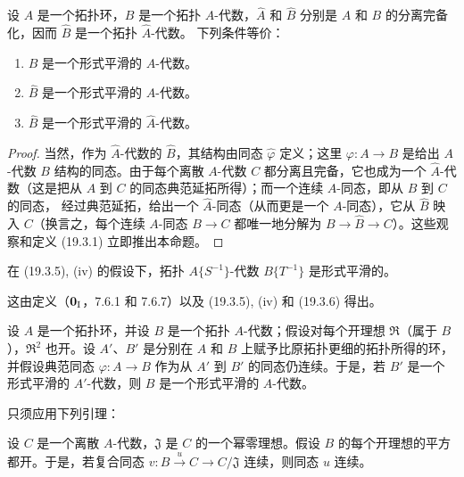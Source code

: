 \begin{proposition}[19.3.6]
\label{0.19.3.6-fr}
设 $A$ 是一个拓扑环，$B$ 是一个拓扑 $A$-代数，$\hat A$ 和 $\hat B$
分别是 $A$ 和 $B$ 的分离完备化，因而 $\hat B$ 是一个拓扑 $\hat A$-代数。
下列条件等价：
\begin{enumerate}
  \item[a)] $B$ 是一个形式平滑的 $A$-代数。
  \item[b)] $\hat B$ 是一个形式平滑的 $A$-代数。
  \item[c)] $\hat B$ 是一个形式平滑的 $\hat A$-代数。
\end{enumerate}
\end{proposition}

\begin{proof}
当然，作为 $\hat A$-代数的 $\hat B$，其结构由同态 $\hat\varphi$ 定义；这里
$\varphi:A\to B$ 是给出 $A$-代数 $B$ 结构的同态。由于每个离散
$A$-代数 $C$ 都分离且完备，它也成为一个 $\hat A$-代数（这是把从 $A$ 到
$C$ 的同态典范延拓所得）；而一个连续 $A$-同态，即从 $B$ 到 $C$ 的同态，
经过典范延拓，给出一个 $\hat A$-同态（从而更是一个 $A$-同态），它从
$\hat B$ 映入 $C$（换言之，每个连续 $A$-同态 $B\to C$ 都唯一地分解为
$B\to\hat B\to C$）。这些观察和定义 (19.3.1) 立即推出本命题。
\end{proof}

\begin{corollary}[19.3.7]
\label{0.19.3.7-fr}
在 (19.3.5), (iv) 的假设下，拓扑 $A\{S^{-1}\}$-代数
$B\{T^{-1}\}$ 是形式平滑的。
\end{corollary}

这由定义（$\mathbf 0_{\rm I}$，7.6.1 和 7.6.7）以及 (19.3.5), (iv) 和
(19.3.6) 得出。

\begin{proposition}[19.3.8]
\label{0.19.3.8-fr}
设 $A$ 是一个拓扑环，并设 $B$ 是一个拓扑 $A$-代数；假设对每个开理想
$\mathfrak R$（属于 $B$），$\mathfrak R^2$ 也开。设 $A'$、$B'$ 是分别在 $A$ 和
$B$ 上赋予比原拓扑更细的拓扑所得的环，并假设典范同态
$\varphi:A\to B$ 作为从 $A'$ 到 $B'$ 的同态仍连续。于是，若 $B'$ 是一个
形式平滑的 $A'$-代数，则 $B$ 是一个形式平滑的 $A$-代数。
\end{proposition}

只须应用下列引理：

\begin{lemma}[19.3.8.1]
\label{0.19.3.8.1-fr}
设 $C$ 是一个离散 $A$-代数，$\mathfrak J$ 是 $C$ 的一个幂零理想。假设
$B$ 的每个开理想的平方都开。于是，若复合同态
$v:B\xrightarrow{u}C\to C/\mathfrak J$ 连续，则同态 $u$ 连续。
\end{lemma}

